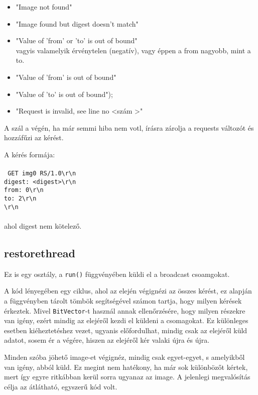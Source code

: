 \documentclass[fleqn,10pt,a4paper,titlepage]{article}
\begin{document}
  \begin{itemize}
  \item "Image not found"
  \item "Image found but digest doesn't match"
  \item "Value of 'from' or 'to' is out of bound"\\
    vagyis valamelyik érvénytelen (negatív), vagy éppen a from nagyobb, mint a to.
  \item  "Value of 'from' is out of bound"
  \item  "Value of 'to' is out of bound");
  \item  "Request is invalid, see line no \textless szám \textgreater" 
  \end{itemize}
  
  A szál a végén, ha már semmi hiba nem votl, írásra zárolja a requests változót és hozzáfűzi az kérést.
  
  A kérés formája:\\\\
  \texttt{
    GET img0 RS/1.0\textbackslash r\textbackslash n\\
    digest: \textless digest\textgreater\textbackslash r\textbackslash n\\
    from: 0\textbackslash r\textbackslash n\\
    to: 2\textbackslash r\textbackslash n\\
    \textbackslash r\textbackslash n\\\\
  }
  ahol  digest nem kötelező.
  
  \subsection{restorethread}
  Ez is egy osztály, a \texttt{run()} függvényében küldi el a broadcast csoamgokat.
  
  A kód lényegében egy ciklus, ahol az elején végignézi az összes kérést, ez alapján a függvényben tárolt tömbök
  segítségével számon tartja, hogy milyen kérések érkeztek. Mivel \texttt{BitVector}-t használ annak ellenőrzésére, hogy
  milyen részekre van igény, ezért mindig az elejéről kezdi el küldeni a csomagokat. Ez különleges esetben
  kiéheztetéshez vezet, ugyanis előfordulhat, mindig csak az elejéről küld adatot, sosem ér a végére, hiszen az elejéről
  kér valaki újra és újra.

  Minden szóba jöhető image-et végignéz, mindig csak egyet-egyet, s amelyikből van igény, abból küld. Ez megint nem
  hatékony, ha már sok különbözőt kértek, mert így egyre ritkábban kerül sorra ugyanaz az image. A jelenlegi
  megvalósítás célja az átlátható, egyszerű kód volt.
\end{document}
